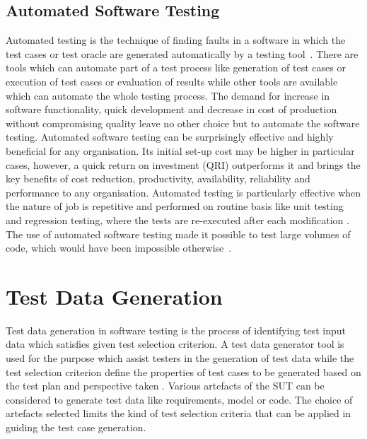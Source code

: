 \subsection{Automated Software Testing}
Automated testing is the technique of finding faults in a software in which the test cases or test oracle are generated automatically by a testing tool~\cite{Leitner2007}. There are tools which can automate part of a test process like generation of test cases or execution of test cases or evaluation of results while other tools are available which can automate the whole testing process. 
The demand for increase in software functionality, quick development and decrease in cost of production without compromising quality leave no other choice but to automate the software testing. Automated software testing can be surprisingly effective and highly beneficial for any organisation. Its initial set-up cost may be higher in particular cases, however, a quick return on investment (QRI) outperforms it and brings the key benefits of cost reduction, productivity, availability, reliability and performance to any organisation. Automated testing is particularly effective when the nature of job is repetitive and performed on routine basis like unit testing and regression testing, where the tests are re-executed after each modification \cite{huang2003automated}. The use of automated software testing made it possible to test large volumes of code, which would have been impossible otherwise~\cite{ramamoorthy1975testing}.

\section{Test Data Generation}
Test data generation in software testing is the process of identifying test input data which satisfies given test selection criterion. A test data generator tool is used for the purpose which assist testers in the generation of test data while the test selection criterion define the properties of test cases to be generated based on the test plan and perspective taken \cite{korel1990}. Various artefacts of the SUT can be considered to generate test data like requirements, model or code. The choice of artefacts selected limits the kind of test selection criteria that can be applied in guiding the test case generation. 

